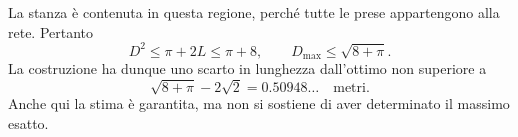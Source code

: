 {La stanza \`e contenuta in questa regione, perch\'e tutte le prese
appartengono alla rete. Pertanto
\[
 D^2\leq\pi+2L\leq\pi+8,
 \qquad D_{\max}\leq\sqrt{8+\pi}.
\]
La costruzione ha dunque uno scarto in lunghezza dall'ottimo
non superiore a
\[
 \sqrt{8+\pi}-2\sqrt2=0.50948\ldots\quad\text{metri}.
\]
Anche qui la stima \`e garantita, ma non si sostiene di aver
determinato il massimo esatto.
}
\renewcommand{\SoluzioniAlternative}{}
\renewcommand{\Osservazioni}{}
\renewcommand{\Commenti}{}
